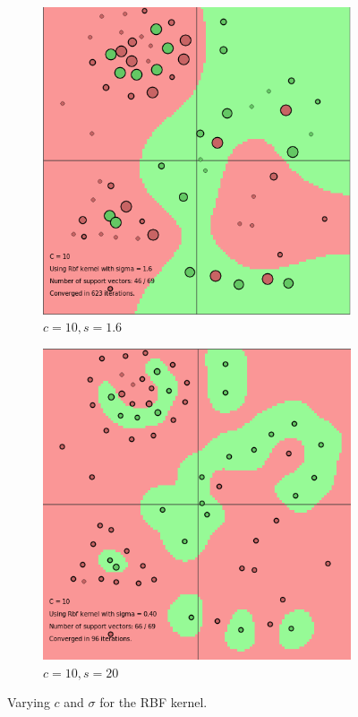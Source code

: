 \documentclass{article}
\begin{document}
\begin{figure}
\bigskip
\hspace*{\fill}
\begin{subfigure}{0.3\textwidth}
   \includegraphics[width=\linewidth]{c=10_s=16}
   \caption{$c=10, s=1.6$} \label{fig:x_g}
\end{subfigure}%
\hspace*{0.05\textwidth}%
\begin{subfigure}{0.3\textwidth}
   \includegraphics[width=\linewidth]{c=10_s=040}
   \caption{$c=10, s=20$} \label{fig:x_h}
\end{subfigure}
\hspace*{\fill}

\caption{Varying $c$ and $\sigma$ for the RBF kernel. }
\end{figure}
\end{document}
